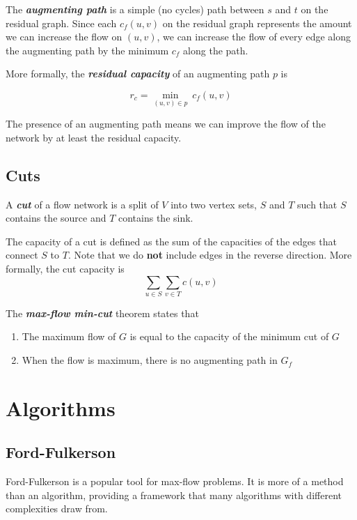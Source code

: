 \documentclass[11pt, oneside]{article}
\newcommand{\smallemphasis}[1]{\textbf{\textit{#1}}}
\begin{document}
The \smallemphasis{augmenting path} is a simple (no cycles) path between \( s \) and \( t \) on the residual graph. Since each \( c_f(u, v) \) on the residual graph represents the amount we can increase the flow on \( (u, v) \), we can increase the flow of every edge along the augmenting path by the minimum \( c_f \) along the path.

More formally, the \smallemphasis{residual capacity} of an augmenting path \( p \) is
\begin{center}
\[ r_c = \min_{(u, v) \in p} \ c_f(u, v) \]
\end{center}

The presence of an augmenting path means we can improve the flow of the network by at least the residual capacity.

\subsection{Cuts}

A \smallemphasis{cut} of a flow network is a split of \( V \) into two vertex sets, \( S \) and \( T \) such that \( S \) contains the source and \( T \) contains the sink.

The capacity of a cut is defined as the sum of the capacities of the edges that connect \( S \) to \( T \). Note that we do \textbf{not} include edges in the reverse direction. More formally, the cut capacity is
\[ \sum_{u \in S} \sum_{v \in T} c(u, v) \]

\newpage

The \smallemphasis{max-flow min-cut} theorem states that
\begin{enumerate}
   \item The maximum flow of \( G \) is equal to the capacity of the minimum cut of \( G \)
   \item When the flow is maximum, there is no augmenting path in \( G_f \)
\end{enumerate}

\section{Algorithms}

\subsection{Ford-Fulkerson}

Ford-Fulkerson is a popular tool for max-flow problems. It is more of a method than an algorithm, providing a framework that many algorithms with different complexities draw from.
\end{document}
